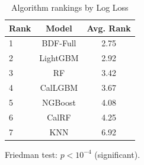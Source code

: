 \begin{table}[htbp]
\centering
\caption{Algorithm rankings by Log Loss}
\label{tab:rankings-log-loss}
\begin{tabular}{lcc}
\toprule
Rank & Model & Avg. Rank \\
\midrule
1 & BDF-Full & 2.75 \\
2 & LightGBM & 2.92 \\
3 & RF & 3.42 \\
4 & CalLGBM & 3.67 \\
5 & NGBoost & 4.08 \\
6 & CalRF & 4.25 \\
7 & KNN & 6.92 \\
\bottomrule
\end{tabular}
\par\smallskip\footnotesize{Friedman test: $p < 10^{-4}$ (significant).}
\end{table}
